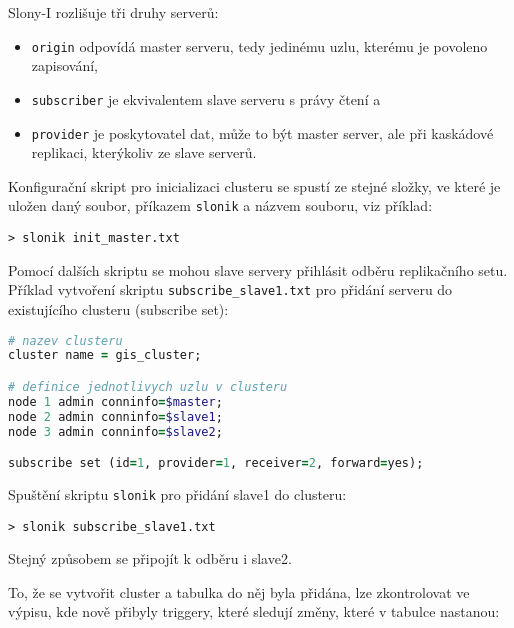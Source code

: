 Slony-I rozlišuje tři druhy serverů:
\begin{itemize}
\item \texttt{origin} odpovídá master serveru, tedy jedinému uzlu, kterému je povoleno zapisování,
\item \texttt{subscriber} je ekvivalentem slave serveru s právy čtení a 
\item \texttt{provider} je poskytovatel dat, může to být master server, ale při kaskádové replikaci, kterýkoliv ze slave serverů. 
\end{itemize}

Konfigurační skript pro inicializaci clusteru se spustí ze stejné složky, ve které je uložen daný soubor, příkazem \texttt{slonik} a názvem souboru, viz příklad:

\begin{lstlisting}
> slonik init_master.txt
\end{lstlisting}

Pomocí dalších skriptu se mohou slave servery přihlásit odběru replikačního setu. Příklad vytvoření skriptu \texttt{subscribe\_slave1.txt} pro přidání serveru do existujícího clusteru (subscribe set):

\begin{lstlisting}[language=ruby]
# nazev clusteru
cluster name = gis_cluster;

# definice jednotlivych uzlu v clusteru
node 1 admin conninfo=$master;
node 2 admin conninfo=$slave1;
node 3 admin conninfo=$slave2;

subscribe set (id=1, provider=1, receiver=2, forward=yes);
\end{lstlisting}

Spuštění skriptu \texttt{slonik} pro přidání slave1 do clusteru:

\begin{lstlisting}
> slonik subscribe_slave1.txt
\end{lstlisting}

Stejný způsobem se připojít k odběru i slave2.

To, že se vytvořit cluster a tabulka do něj byla přidána, lze zkontrolovat ve výpisu, kde nově přibyly triggery, které sledují změny, které v tabulce nastanou:

